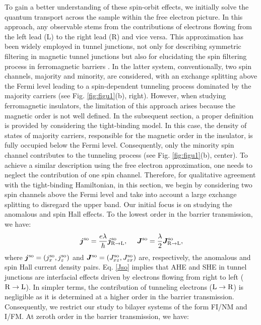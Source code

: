 \documentclass[10pt,pr,twocolumn,showpacs,amssymb,floatfix,superscriptaddress]{revtex4-1}
\newcommand{\raw}{\rightarrow}
\newcommand{\lam}{\lambda}
\begin{document}
To gain a better understanding of these spin-orbit effects, we initially solve the quantum transport across the sample within the free electron picture. In this approach, any observable stems from the contributions of electrons flowing from the left lead (L) to the right lead (R) and vice versa. This approximation has been widely employed in tunnel junctions, not only for describing symmetric filtering in magnetic tunnel junctions but also for elucidating the spin filtering process in ferromagnetic barriers \cite{sf, Eu}. In the latter system, conventionally, two spin channels, majority and minority, are considered, with an exchange splitting above the Fermi level leading to a spin-dependent tunneling process dominated by the majority carriers (see Fig. \ref{fig:figu1}(b), right). However, when studying ferromagnetic insulators, the limitation of this approach arises because the magnetic order is not well defined. In the subsequent section, a proper definition is provided by considering the tight-binding model. In this case, the density of states of majority carriers, responsible for the magnetic order in the insulator, is fully occupied below the Fermi level. Consequently, only the minority spin channel contributes to the tunneling process (see Fig. \ref{fig:figu1}(b), center). To achieve a similar description using the free electron approximation, one needs to neglect the contribution of one spin channel. Therefore, for qualitative agreement with the tight-binding Hamiltonian, in this section, we begin by considering two spin channels above the Fermi level and take into account a large exchange splitting to disregard the upper band. Our initial focus is on studying the anomalous and spin Hall effects. To the lowest order in the barrier transmission, we have:
\begin{equation}
\begin{aligned}
\bm j^{\rm so} = \frac{e\lam}{\hbar}  \bm j_{\rm R\raw L}^{\rm so},~~~~ \bm J^{\rm so} = \frac{\lam}{2} \bm J_{\rm R\raw L}^{\rm so}, 
\label{Jso}
\end{aligned}
\end{equation}
where $\bm j^{\rm so}=(j_x^{\rm so},j_z^{\rm so})$ and $\bm J^{\rm so} = (J^{\rm so}_{xz},J^{\rm so}_{zx})$  are, respectively, the anomalous and spin Hall current density pairs. Eq. \eqref{Jso} implies that AHE and SHE in tunnel junctions are interfacial effects driven by electrons flowing from right to left (${\rm R \raw L}$). In simpler terms, the contribution of tunneling electrons (${\rm L \rightarrow R}$) is negligible as it is determined at a higher order in the barrier transmission. Consequently, we restrict our study to bilayer systems of the form FI/NM and I/FM. At zeroth order in the barrier transmission, we have:
\end{document}
